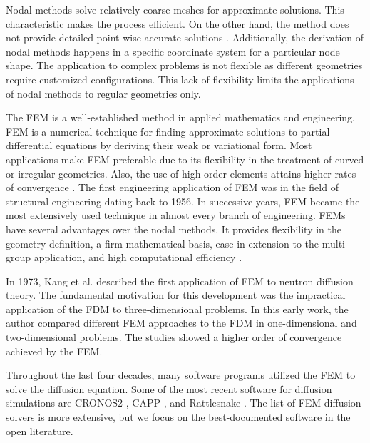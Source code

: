 Nodal methods solve relatively coarse meshes for approximate solutions.
This characteristic makes the process efficient.
On the other hand, the method does not provide detailed point-wise accurate solutions \cite{kang_finite_1973}.
Additionally, the derivation of nodal methods happens in a specific coordinate system for a particular node shape.
The application to complex problems is not flexible as different geometries require customized configurations.
This lack of flexibility limits the applications of nodal methods to regular geometries only.

The \gls{FEM} is a well-established method in applied mathematics and engineering.
\gls{FEM} is a numerical technique for finding approximate solutions to partial differential equations by deriving their weak or variational form.
Most applications make \gls{FEM} preferable due to its flexibility in the treatment of curved or irregular geometries.
Also, the use of high order elements attains higher rates of convergence \cite{cavdar_finite_2004}.
The first engineering application of \gls{FEM} was in the field of structural engineering dating back to 1956.
In successive years, \gls{FEM} became the most extensively used technique in almost every branch of engineering.
\glspl{FEM} have several advantages over the nodal methods.
It provides flexibility in the geometry definition, a firm mathematical basis, ease in extension to the multi-group application, and high computational efficiency \cite{lee_development_2008}.

In 1973, Kang et al. \cite{kang_finite_1973} described the first application of \gls{FEM} to neutron diffusion theory.
The fundamental motivation for this development was the impractical application of the \gls{FDM} to three-dimensional problems.
In this early work, the author compared different \gls{FEM} approaches to the \gls{FDM} in one-dimensional and two-dimensional problems.
The studies showed a higher order of convergence achieved by the \gls{FEM}.

Throughout the last four decades, many software programs utilized the \gls{FEM} to solve the diffusion equation.
Some of the most recent software for diffusion simulations are CRONOS2 \cite{lautard_cronos_1990}, CAPP \cite{lee_development_2011}, and Rattlesnake \cite{wang_rattlesnake_2019}.
The list of \gls{FEM} diffusion solvers is more extensive, but we focus on the best-documented software in the open literature.

